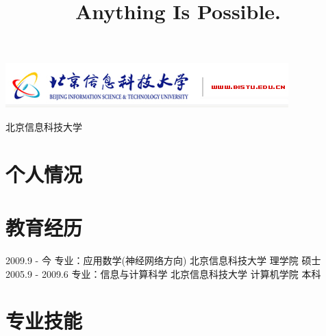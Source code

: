 \documentclass[a4paper]{moderncvwutao}
\begin{document}
\begin{CJK*}{UTF8}{gbsn}

\includegraphics{./biti_logo.png}
\title{Anything Is Possible.}
\address{\Writinghand 北京市海淀区清河小营东路12号}{北京信息科技大学}

\maketitle

\section{个人情况}
{}
{}
{}
\section{教育经历}
\cventry
{ 2009.9 - 今 }
{ 专业：应用数学(神经网络方向) }
{ 北京信息科技大学 }
{ 理学院 }
{ 硕士}
{}
\cventry
{ 2005.9 - 2009.6 }
{ 专业：信息与计算科学 }
{ 北京信息科技大学 }
{ 计算机学院 }
{ 本科 }
{}

\section{专业技能}


\end{CJK*}
\end{document}
